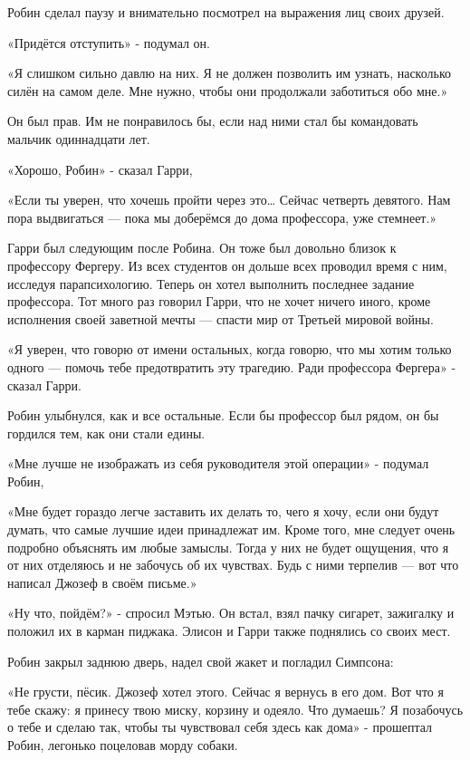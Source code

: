 \documentclass[a4paper,12pt]{book}
\begin{document}
\par
Робин сделал паузу и внимательно посмотрел на выражения лиц своих друзей.
\par
«Придётся отступить» - подумал он.
\par
«Я слишком сильно давлю на них. Я не должен позволить им узнать, насколько силён на самом деле. Мне нужно, чтобы они продолжали заботиться обо мне.»
\par
Он был прав. Им не понравилось бы, если над ними стал бы командовать мальчик одиннадцати лет.
\par
«Хорошо, Робин» - сказал Гарри,
\par
«Если ты уверен, что хочешь пройти через это… Сейчас четверть девятого. Нам пора выдвигаться — пока мы доберёмся до дома профессора, уже стемнеет.»
\par
Гарри был следующим после Робина. Он тоже был довольно близок к профессору Фергеру. Из всех студентов он дольше всех проводил время с ним, исследуя парапсихологию. Теперь он хотел выполнить последнее задание профессора. Тот много раз говорил Гарри, что не хочет ничего иного, кроме исполнения своей заветной мечты — спасти мир от Третьей мировой войны.\\
\par
«Я уверен, что говорю от имени остальных, когда говорю, что мы хотим только одного — помочь тебе предотвратить эту трагедию. Ради профессора Фергера» - сказал Гарри.
\par
Робин улыбнулся, как и все остальные. Если бы профессор был рядом, он бы гордился тем, как они стали едины.
\par
«Мне лучше не изображать из себя руководителя этой операции» - подумал Робин,
\par
«Мне будет гораздо легче заставить их делать то, чего я хочу, если они будут думать, что самые лучшие идеи принадлежат им. Кроме того, мне следует очень подробно объяснять им любые замыслы. Тогда у них не будет ощущения, что я от них отделяюсь и не забочусь об их чувствах. Будь с ними терпелив — вот что написал Джозеф в своём письме.»
\par
«Ну что, пойдём?» - спросил Мэтью. Он встал, взял пачку сигарет, зажигалку и положил их в карман пиджака. Элисон и Гарри также поднялись со своих мест.\\
\par
Робин закрыл заднюю дверь, надел свой жакет и погладил Симпсона:
\par
«Не грусти, пёсик. Джозеф хотел этого. Сейчас я вернусь в его дом. Вот что я тебе скажу: я принесу твою миску, корзину и одеяло. Что думаешь? Я позабочусь о тебе и сделаю так, чтобы ты чувствовал себя здесь как дома» - прошептал Робин, легонько поцеловав морду собаки.
\end{document}
